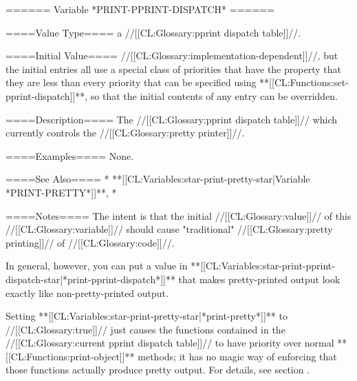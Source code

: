 ====== Variable *PRINT-PPRINT-DISPATCH* ======

====Value Type====
a //[[CL:Glossary:pprint dispatch table]]//.

====Initial Value====
//[[CL:Glossary:implementation-dependent]]//, but the initial entries all use a special class of priorities that have the property that they are less than every priority that can be specified using **[[CL:Functions:set-pprint-dispatch]]**, so that the initial contents of any entry can be overridden.

====Description====
The //[[CL:Glossary:pprint dispatch table]]// which currently controls the //[[CL:Glossary:pretty printer]]//.

====Examples====
None.

====See Also====
  * **[[CL:Variables:star-print-pretty-star|Variable *PRINT-PRETTY*]]**,
  * {\secref\PPrintDispatchTables}

====Notes====
The intent is that the initial //[[CL:Glossary:value]]// of this //[[CL:Glossary:variable]]// should cause "traditional" //[[CL:Glossary:pretty printing]]// of //[[CL:Glossary:code]]//.

In general, however, you can put a value in **[[CL:Variables:star-print-pprint-dispatch-star|*print-pprint-dispatch*]]** that makes pretty-printed output look exactly like non-pretty-printed output.

Setting **[[CL:Variables:star-print-pretty-star|*print-pretty*]]** to //[[CL:Glossary:true]]// just causes the functions contained in the //[[CL:Glossary:current pprint dispatch table]]// to have priority over normal **[[CL:Functions:print-object]]** methods; it has no magic way of enforcing that those functions actually produce pretty output. For details, see section {\secref\PPrintDispatchTables}.

 
